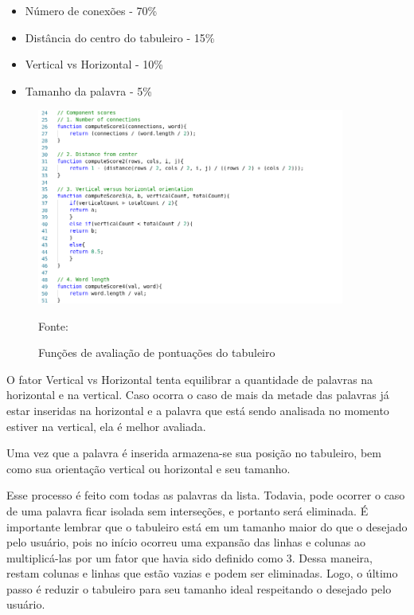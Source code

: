 \begin{itemize}
    \item Número de conexões - 70\%
    \item Distância do centro do tabuleiro - 15\%
    \item Vertical vs Horizontal - 10\%
    \item Tamanho da palavra - 5\%
\end{itemize}

\begin{figure}[H]
\centering
    \caption{Funções de avaliação de pontuações do tabuleiro}
    \label{fig:codeScores}
    \includegraphics[width=0.9\textwidth]{Figuras/codeComponentScores.png}
    
    Fonte: \cite{layoutGenerator}
\end{figure}

O fator Vertical vs Horizontal tenta equilibrar a quantidade de palavras na horizontal e na vertical. Caso ocorra o caso de mais da metade das palavras já estar inseridas na horizontal e a palavra que está sendo analisada no momento estiver na vertical, ela é melhor avaliada.

Uma vez que a palavra é inserida armazena-se sua posição no tabuleiro, bem como sua orientação vertical ou horizontal e seu tamanho.

Esse processo é feito com todas as palavras da lista. Todavia, pode ocorrer o caso de uma palavra ficar isolada sem interseções, e portanto será eliminada. É importante lembrar que o tabuleiro está em um tamanho maior do que o desejado pelo usuário, pois no início ocorreu uma expansão das linhas e colunas ao multiplicá-las por um fator que havia sido definido como 3. Dessa maneira, restam colunas e linhas que estão vazias e podem ser eliminadas. Logo, o último passo é reduzir o tabuleiro para seu tamanho ideal respeitando o desejado pelo usuário. 

